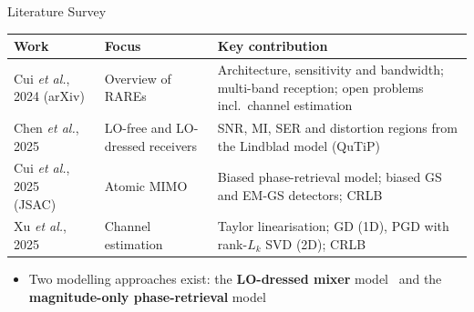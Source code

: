 \documentclass[10pt,xcolor=x11names,compress,aspectratio=169]{beamer}
\begin{document}
\begin{frame}{Literature Survey}
\small
\renewcommand{\arraystretch}{1.3}
\begin{tabular}{p{3.2cm}p{3.4cm}p{7.4cm}}
\toprule
\textbf{Work} & \textbf{Focus} & \textbf{Key contribution}\\
\midrule
Cui \textit{et al.}, 2024 (arXiv)~\cite{cui2026rare} & Overview of RAREs & Architecture, sensitivity and bandwidth; multi-band reception; open problems incl.\ channel estimation\\
Chen \textit{et al.}, 2025~\cite{chen2025harnessing} & LO-free and LO-dressed receivers & SNR, MI, SER and distortion regions from the Lindblad model (QuTiP)\\
Cui \textit{et al.}, 2025 (JSAC)~\cite{cui2025towards} & Atomic MIMO & Biased phase-retrieval model; biased GS and EM-GS detectors; CRLB\\
Xu \textit{et al.}, 2025~\cite{xu2025channel} & Channel estimation & Taylor linearisation; GD (1D), PGD with rank-$L_k$ SVD (2D); CRLB\\\bottomrule
\end{tabular}
\vspace{3mm}
\begin{itemize}\footnotesize
  \item Two modelling approaches exist: the \textbf{LO-dressed mixer} model~\cite{chen2025harnessing}
  and the \textbf{magnitude-only phase-retrieval} model~\cite{cui2025towards,xu2025channel}
\end{itemize}
\end{frame}

\end{document}
